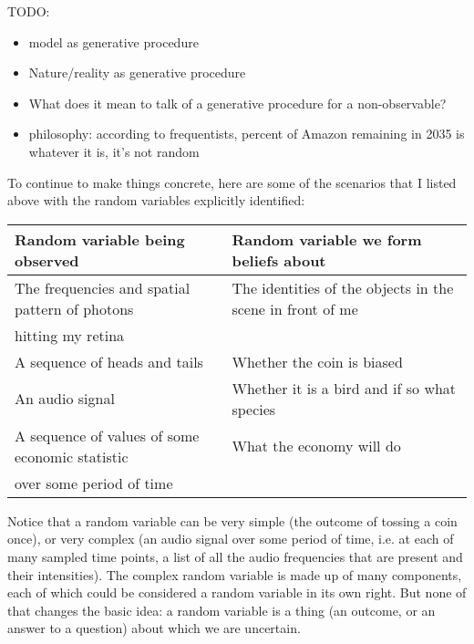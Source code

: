 TODO:

\begin{itemize}
\item model as generative procedure
\item Nature/reality as generative procedure
\item What does it mean to talk of a generative procedure for a non-observable?
\item philosophy: according to frequentists, percent of Amazon remaining in 2035 is whatever it is, it's not random
\end{itemize}

To continue to make things concrete, here are some of the scenarios that I listed above with the random variables explicitly identified:

\begin{table}[h!]
  \centering
  \begin{tabular}{|l|l|}
    \hline
    {\bf Random variable being observed} & {\bf Random variable we form beliefs about} \\
    \hline
    The frequencies and spatial pattern of photons  & The identities of the objects in the scene in front of me \\
    hitting my retina & \\
    \hline
    A sequence of heads and tails  & Whether the coin is biased \\
    \hline
    An audio signal                    & Whether it is a bird and if so what species \\
    \hline
    A sequence of values of some economic statistic & What the economy will do \\
    over some period of time   & \\
    \hline
  \end{tabular}
\end{table}

Notice that a random variable can be very simple (the outcome of tossing a coin once), or very complex (an audio signal over some period of time, i.e. at each of many sampled time points, a list of all the audio frequencies that are present and their intensities). The complex random variable is made up of many components, each of which could be considered a random variable in its own right. But none of that changes the basic idea: a random variable is a thing (an outcome, or an answer to a question) about which we are uncertain.





